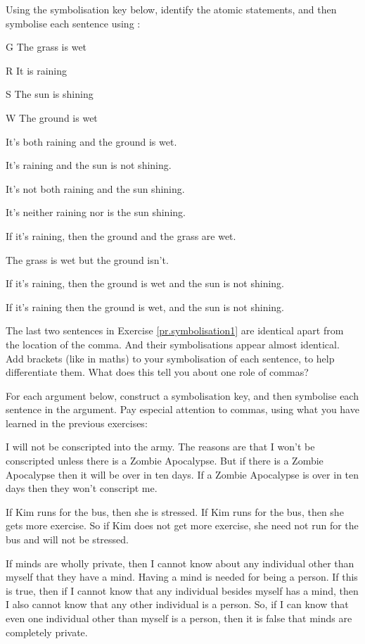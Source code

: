 \documentclass[PHIL101-Textbook.tex]{subfiles}
\begin{document}
\practiceproblems
\noindent\solutions
\problempart\label{pr.symbolisation1}
Using the symbolisation key below, identify the atomic statements, and then symbolise each sentence using \tfl:
	\begin{ekey}
		\item[G] The grass is wet
		\item[R] It is raining
		\item[S] The sun is shining
		\item[W] The ground is wet
	\end{ekey}
\begin{earg}
\item It’s both raining and the ground is wet.
\item It’s raining and the sun is not shining.
\item It’s not both raining and the sun shining.
\item It’s neither raining nor is the sun shining.
\item If it’s raining, then the ground and the grass are wet.
\item The grass is wet but the ground isn't.
\item If it’s raining, then the ground is wet and the sun is not shining.
\item If it’s raining then the ground is wet, and the sun is not shining.
\end{earg}
\problempart
The last two sentences in Exercise \ref{pr.symbolisation1} are identical apart from the location of the comma. And their symbolisations appear almost identical. Add brackets (like in maths) to your symbolisation of each sentence, to help differentiate them. What does this tell you about one role of commas?
\medskip

\noindent\solutions
\problempart\label{pr.symboliseargument1}
For each argument below, construct a symbolisation key, and then symbolise each sentence in the argument. Pay especial attention to commas, using what you have learned in the previous exercises:
\begin{earg}
\item I will not be conscripted into the army. The reasons are that I won’t be conscripted unless there is a Zombie Apocalypse. But if there is a Zombie Apocalypse then it will be over in ten days. If a Zombie Apocalypse is over in ten days then they won’t conscript me.

\item If Kim runs for the bus, then she is stressed. If Kim runs for the bus, then she gets more exercise.  So if Kim does not get more exercise, she need not run for the bus and will not be stressed.

\item If minds are wholly private, then I cannot know about any individual other than myself that they have a mind.
Having a mind is needed for being a person. 
If this is true, then if I cannot know that any individual besides myself has a mind, then I also cannot know that any other individual is a person.
 So, if I can know that even one individual other than myself is a person, then it is false that minds are completely private.
\end{earg}
\end{document}
